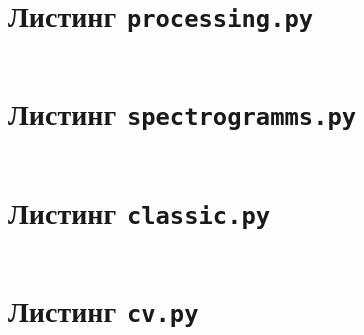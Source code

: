 \documentclass[spec, och, diploma]{SCWorks}
\begin{document}
    \section{Листинг \texttt{processing.py}}
    \inputminted{py}{code/processing.py}

    \section{Листинг \texttt{spectrogramms.py}}
    \inputminted{py}{code/spectrogramms.py}

    \section{Листинг \texttt{classic.py}}
    \inputminted{py}{code/classic.py}

    \section{Листинг \texttt{cv.py}}
    \inputminted{py}{code/cv.py}
\end{document}

